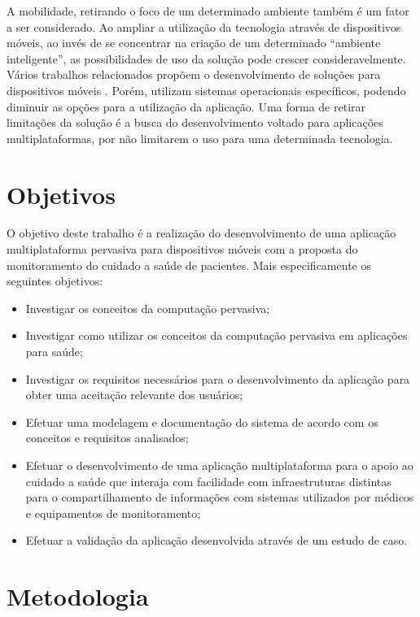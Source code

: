\documentclass[a4paper,10pt]{article}
\begin{document}
A mobilidade, retirando o foco de um determinado ambiente também é um fator a ser considerado. Ao ampliar a utilização da 
tecnologia através de dispositivos móveis, ao invés de se concentrar na criação de um determinado “ambiente inteligente”, 
as possibilidades de uso da solução pode crescer consideravelmente. Vários trabalhos relacionados propõem o desenvolvimento 
de soluções para dispositivos móveis \cite{Feng,Teles,Munoz,Sharmin}. Porém, utilizam sistemas operacionais 
específicos, podendo diminuir as opções para a utilização da aplicação. Uma forma de retirar limitações da solução é a busca 
do desenvolvimento voltado para aplicações multiplataformas, por não limitarem o uso para uma determinada tecnologia.  

\section{Objetivos}

O objetivo deste trabalho é a realização do desenvolvimento de uma aplicação multiplataforma pervasiva para dispositivos 
móveis com a proposta do monitoramento do cuidado a saúde de pacientes. Mais especificamente os seguintes objetivos:
 
\begin{itemize}

\item Investigar os conceitos da computação pervasiva;
\item Investigar como utilizar os conceitos da computação pervasiva em aplicações para saúde;
\item Investigar os requisitos necessários para o desenvolvimento da aplicação para obter uma aceitação relevante dos usuários;
\item Efetuar uma modelagem e documentação do sistema de acordo com os conceitos e requisitos analisados; 
\item Efetuar o desenvolvimento de uma aplicação multiplataforma para o apoio ao cuidado a saúde que interaja com facilidade com infraestruturas distintas para o compartilhamento de informações com sistemas utilizados por médicos e equipamentos de monitoramento;
\item Efetuar a validação da aplicação desenvolvida através de um estudo de caso.

\end{itemize}

\section{Metodologia}
\end{document}
